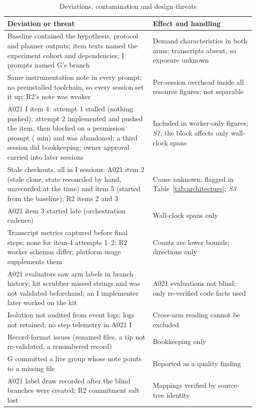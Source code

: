 \documentclass[10pt,conference]{IEEEtran}
\newcommand{\G}{G}
\newcommand{\I}{I}
\begin{document}
\begin{table}[t]
\centering
\scriptsize
\caption{Deviations, contamination and design threats}
\label{tab:deviations}
\begin{tabular}{@{}p{}p{}@{}}
\hline
Deviation or threat & Effect and handling \\
\hline
Baseline contained the hypothesis, protocol and planner outputs; item texts named the experiment cohort and dependencies; \I{} prompts named \G's branch & Demand characteristics in both arms; transcripts absent, so exposure unknown \\
Same instrumentation note in every prompt; no preinstalled toolchain, so every session set it up; R2's note was weaker & Per-session overhead inside all resource figures; not separable \\
A021 \I{} item 4: attempt 1 stalled (nothing pushed); attempt 2 implemented and pushed the item, then blocked on a permission prompt (\AblockedMinIndep{} min) and was abandoned; a third session did bookkeeping; owner approval carried into later sessions & Included in worker-only figures; \emph{S1}; the block affects only wall-clock spans \\
Stale checkouts, all in \I{} sessions: A021 item 2 (stale clone, state reconciled by hand, unrecorded at the time) and item 5 (started from the baseline); R2 items 2 and 3 & Cause unknown; flagged in Table~\ref{tab:architecture}; \emph{S3} \\
A021 item 3 started late (orchestration cadence) & Wall-clock spans only \\
Transcript metrics captured before final steps; none for item-4 attempts 1--2; R2 worker schemas differ; platform usage supplements them & Counts are lower bounds; directions only \\
A021 evaluators saw arm labels in branch history; kit scrubber missed strings and was not validated beforehand; an \I{} implementer later worked on the kit & A021 evaluations not blind; only re-verified code facts used \\
Isolation not audited from event logs; logs not retained; no step telemetry in A021 \I & Cross-arm reading cannot be excluded \\
Record-format issues (renamed files, a tip not re-validated, a renumbered record) & Bookkeeping only \\
\G{} committed a live group whose note points to a missing file & Reported as a quality finding \\
A021 label draw recorded after the blind branches were created; R2 commitment salt lost & Mappings verified by source-tree identity \\

\end{tabular}
\end{table}
\end{document}
